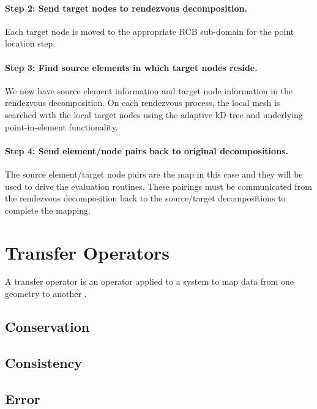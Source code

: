 \documentclass[letterpaper,12pt]{article}
\begin{document}
\paragraph{Step 2: Send target nodes to rendezvous decomposition.}
Each target node is moved to the appropriate RCB sub-domain for the
point location step.

\paragraph{Step 3: Find source elements in which target nodes reside.}
We now have source element information and target node information in
the rendezvous decomposition. On each rendezvous process, the local
mesh is searched with the local target nodes using the adaptive
kD-tree and underlying point-in-element functionality.

\paragraph{Step 4: Send element/node pairs back to original
  decompositions.}  The source element/target node pairs are the map
in this case and they will be used to drive the evaluation
routines. These pairings must be communicated from the rendezvous
decomposition back to the source/target decompositions to complete the
mapping.

\clearpage

\section{Transfer Operators}\label{sec:transfer}
A transfer operator is an operator applied to a system to map data
from one geometry to another \cite{LIME_2011}.

\subsection{Conservation}\label{subsec:conservation}

\subsection{Consistency}\label{subsec:consistency}

\subsection{Error}\label{subsec:error}
\end{document}
